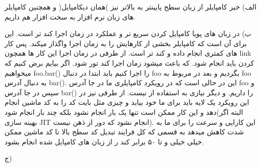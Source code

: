 


الف) خیر کامپایلر از زبان سطح پایینتر به بالاتر نیز )همان دیکامپایل( و همچنین کامپایلر های زبان نرم افزار به سخت افزار هم داریم.

ب) در زبان های پویا کامپایل کردن سریع تر و عملکرد در زمان اجرا کند تر است. \newline
این برای آن است که کامپایلر بخشی از کارهایش را به زمان اجرا واگذاز میکند. پس کار های کمتری انجام داده و کند تر است. از طرفی در زمان اجرا این کار ها همچون link کردن باید انجام شود. که باعث میشود زمان اجرا کند تور شود.\newline
اگر بیایم برض کنیم که میخواهیم foo.bar() را اجرا کنیم باید ابتدا در  دنبال foo بگردیم و بعد در  مربوط به foo به دنبال آدرس bar(). این در حالی است که در رویکرد کامپایلری ما در جا آدرس foo و سپس در جا آدرس bar() را داریم. و دیگر نیازی به استفاده از  نیست. از طرفی نیز در این رویکرد یک لایه باید برای ما خود بیاید و چیزی مثل بایت کد را به کد ماشین انجام دهد و این کار ممکن است تنها یک بار انجام نشود بلکه چند بار انجام شود(البته اگر بهینه سازی JIT انجام نشود که دور از ذهن نیست). این کارایی و سرعت را برای ما به شدت کاهش میدهد به قسمی که کل فرایند تبدیل کد سطح بالا تا کد ماشین ممکن خیلی خیلی و تا ۵۰ برابر کند ر از زبان های کامپایل شده انجام بشود. \newline

ج) 

\begin{latin}
\end{latin}
